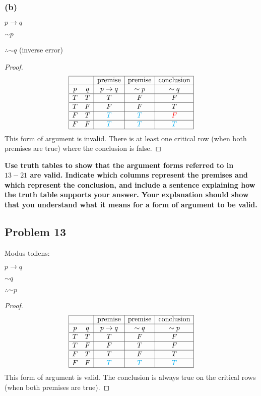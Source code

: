 \documentclass[14pt]{extarticle}
\begin{document}
\subsubsection{(b)}
$p \to q$

${\sim p}$

$\therefore {\sim q}$ (inverse error)

\begin{proof}
$$
\begin{array}{|cc|c|c|c|}
\hline
 & & \text{premise} & \text{premise} & \text{conclusion} \\
\hline
p & q & p \to q & {\sim p} & {\sim q} \\
\hline
T & T & T & F & F \\
\hline
T & F & F & F & T \\
\hline
F & T & \color{cyan} T & \color{cyan} T & \color{red} F \\
\hline
F & F & \color{cyan} T & \color{cyan} T & \color{cyan} T \\
\hline
\end{array}
$$
This form of argument is invalid. There is at least one critical row (when both
premises are true) where the conclusion is false.
\end{proof}

{\bf \color{cyan} Use truth tables to show that the argument forms referred to
in $13-21$ are valid. Indicate which columns represent the premises and which
represent the conclusion, and include a sentence explaining how the truth table
supports your
answer. Your explanation should show that you understand what it means for a
form of argument to be valid.}

\subsection{Problem 13}
Modus tollens:

$p \to q$

${\sim q}$

$\therefore {\sim p}$

\begin{proof}
$$
\begin{array}{|cc|c|c|c|}
\hline
 & & \text{premise} & \text{premise} & \text{conclusion} \\
\hline
p & q & p \to q & {\sim q} & {\sim p} \\
\hline
T & T & T & F & F \\
\hline
T & F & F & T & F \\
\hline
F & T & T & F & T \\
\hline
F & F & \color{cyan} T & \color{cyan} T & \color{cyan} T \\
\hline
\end{array}
$$
This form of argument is valid. The conclusion is always true on the critical
rows (when both premises are true).
\end{proof}
\end{document}
